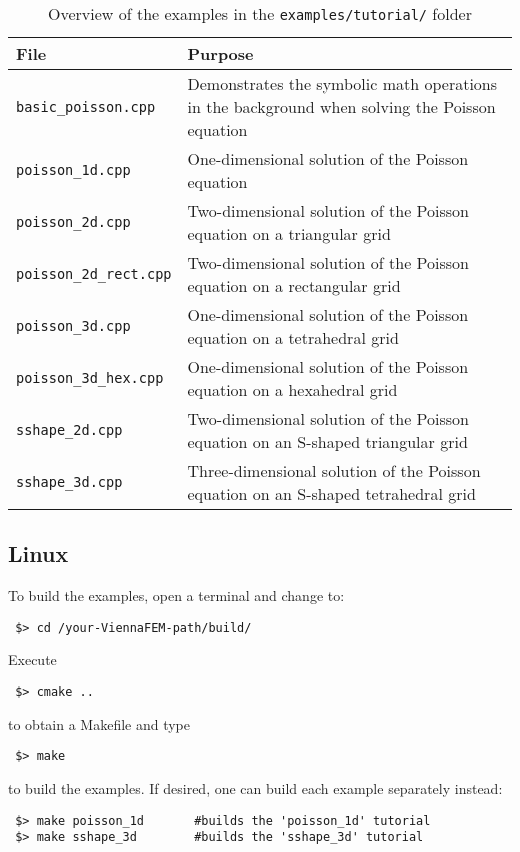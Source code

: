 \begin{table}[tb]
\begin{center}
\begin{tabular}{l|p{9.5cm}}
File & Purpose\\
\hline
\texttt{basic\_poisson.cpp}           & Demonstrates the symbolic math operations in the background when solving the Poisson equation \\
\texttt{poisson\_1d.cpp}              & One-dimensional solution of the Poisson equation \\
\texttt{poisson\_2d.cpp}              & Two-dimensional solution of the Poisson equation on a triangular grid\\
\texttt{poisson\_2d\_rect.cpp}        & Two-dimensional solution of the Poisson equation on a rectangular grid\\
\texttt{poisson\_3d.cpp}              & One-dimensional solution of the Poisson equation on a tetrahedral grid\\
\texttt{poisson\_3d\_hex.cpp}         & One-dimensional solution of the Poisson equation on a hexahedral grid\\
\texttt{sshape\_2d.cpp}               & Two-dimensional solution of the Poisson equation on an S-shaped triangular grid\\
\texttt{sshape\_3d.cpp}               & Three-dimensional solution of the Poisson equation on an S-shaped tetrahedral grid\\
\end{tabular}
\caption{Overview of the examples in the \texttt{examples/tutorial/} folder}
\label{tab:tutorial-dependencies}
\end{center}
\end{table}

\subsection{Linux}
To build the examples, open a terminal and change to:

\begin{lstlisting}
 $> cd /your-ViennaFEM-path/build/
\end{lstlisting}
Execute
\begin{lstlisting}
 $> cmake ..
\end{lstlisting}
to obtain a Makefile and type
\begin{lstlisting}
 $> make
\end{lstlisting}
to build the examples. If desired, one can build each example separately instead:
\begin{lstlisting}
 $> make poisson_1d       #builds the 'poisson_1d' tutorial
 $> make sshape_3d        #builds the 'sshape_3d' tutorial
\end{lstlisting}

